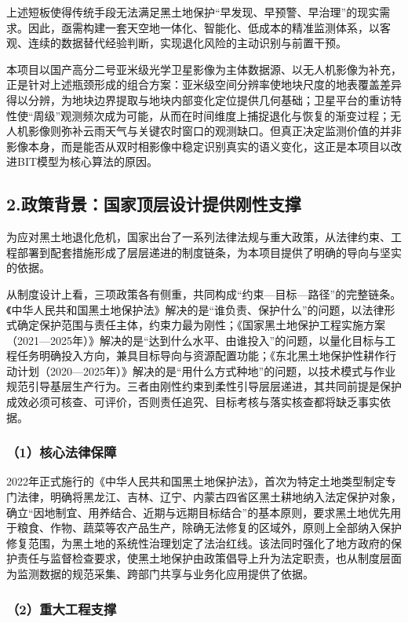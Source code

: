\documentclass[12pt, a4paper]{ctexart}
\begin{document}
上述短板使得传统手段无法满足黑土地保护“早发现、早预警、早治理”的现实需求。因此，亟需构建一套天空地一体化、智能化、低成本的精准监测体系，以客观、连续的数据替代经验判断，实现退化风险的主动识别与前置干预。

本项目以国产高分二号亚米级光学卫星影像为主体数据源、以无人机影像为补充，正是针对上述瓶颈形成的组合方案：亚米级空间分辨率使地块尺度的地表覆盖差异得以分辨，为地块边界提取与地块内部变化定位提供几何基础；卫星平台的重访特性使“周级”观测频次成为可能，从而在时间维度上捕捉退化与恢复的渐变过程；无人机影像则弥补云雨天气与关键农时窗口的观测缺口。但真正决定监测价值的并非影像本身，而是能否从双时相影像中稳定识别真实的语义变化，这正是本项目以改进BIT模型为核心算法的原因。

\subsection{2.政策背景：国家顶层设计提供刚性支撑}

为应对黑土地退化危机，国家出台了一系列法律法规与重大政策，从法律约束、工程部署到配套措施形成了层层递进的制度链条，为本项目提供了明确的导向与坚实的依据。

从制度设计上看，三项政策各有侧重，共同构成“约束—目标—路径”的完整链条。《中华人民共和国黑土地保护法》解决的是“谁负责、保护什么”的问题，以法律形式确定保护范围与责任主体，约束力最为刚性；《国家黑土地保护工程实施方案（2021—2025年）》解决的是“达到什么水平、由谁投入”的问题，以量化目标与工程任务明确投入方向，兼具目标导向与资源配置功能；《东北黑土地保护性耕作行动计划（2020—2025年）》解决的是“用什么方式种地”的问题，以技术模式与作业规范引导基层生产行为。三者由刚性约束到柔性引导层层递进，其共同前提是保护成效必须可核查、可评价，否则责任追究、目标考核与落实核查都将缺乏事实依据。

\subsubsection{（1）核心法律保障}

2022年正式施行的《中华人民共和国黑土地保护法》，首次为特定土地类型制定专门法律，明确将黑龙江、吉林、辽宁、内蒙古四省区黑土耕地纳入法定保护对象，确立“因地制宜、用养结合、近期与远期目标结合”的基本原则，要求黑土地优先用于粮食、作物、蔬菜等农产品生产，除确无法修复的区域外，原则上全部纳入保护修复范围，为黑土地的系统性治理划定了法治红线。该法同时强化了地方政府的保护责任与监督检查要求，使黑土地保护由政策倡导上升为法定职责，也从制度层面为监测数据的规范采集、跨部门共享与业务化应用提供了依据。

\subsubsection{（2）重大工程支撑}
\end{document}
